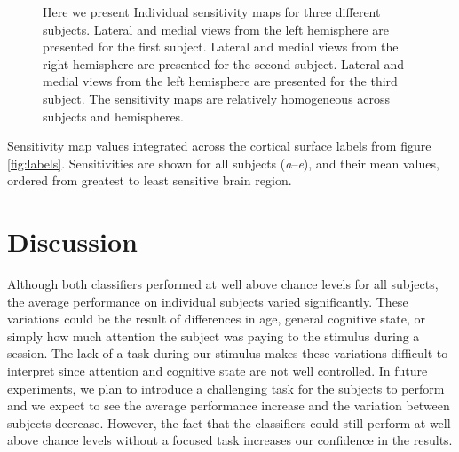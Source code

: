 \documentclass[review,1p,authoryear]{elsarticle}
\begin{document}
\begin{figure}[p]
\begin{subfigure}{0.3\textwidth}
\caption{}
\label{fig:s3-lh-medial-sensitivity}
\end{subfigure}
\caption{Here we present Individual sensitivity maps for three different subjects. 
Lateral  and medial  views from the left hemisphere are presented for the first subject.
Lateral  and medial  views from the right hemisphere are presented for the second subject.
Lateral  and medial  views from the left hemisphere are presented for the third subject.
The sensitivity maps are relatively homogeneous across subjects and hemispheres.}
\label{fig:individual-sensitivity}
\end{figure}

\begin{table}[p]
\centering

\caption{Sensitivity map values integrated across the cortical surface labels from figure \ref{fig:labels}. Sensitivities are shown for all subjects (\emph{a}--\emph{e}), and their mean values, ordered from greatest to least sensitive brain region.}
\label{tab:full-sensitivity}
\end{table}

\section{Discussion}
Although both classifiers performed at well above chance levels for all subjects, the average performance on individual subjects varied significantly.
These variations could be the result of differences in age, general cognitive state, or simply how much attention the subject was paying to the stimulus during a session.
The lack of a task during our stimulus makes these variations difficult to interpret since attention and cognitive state are not well controlled.
In future experiments, we plan to introduce a challenging task for the subjects to perform and we expect to see the average performance increase and the variation between subjects decrease.
However, the fact that the classifiers could still perform at well above chance levels without a focused task increases our confidence in the results.
\end{document}
